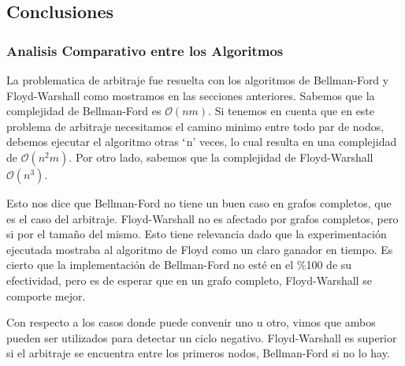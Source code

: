 \subsection{Conclusiones}

\subsubsection{Analisis Comparativo entre los Algoritmos} \label{analisisComparativo}

La problematica de arbitraje fue resuelta con los algoritmos de Bellman-Ford y Floyd-Warshall como mostramos en las secciones anteriores. Sabemos que la complejidad de Bellman-Ford es $\mathcal{O}(nm)$. Si tenemos en cuenta que en este problema de arbitraje necesitamos el camino minimo entre todo par de nodos, debemos ejecutar el algoritmo otras $`$n' veces, lo cual resulta en una complejidad de $\mathcal{O}(n^{2}m)$. Por otro lado, sabemos que la complejidad de Floyd-Warshall $\mathcal{O}(n^{3})$.

Esto nos dice que Bellman-Ford no tiene un buen caso en grafos completos, que es el caso del arbitraje. Floyd-Warshall no es afectado por grafos completos, pero si por el tamaño del mismo. Esto tiene relevancia dado que la experimentación ejecutada mostraba al algoritmo de Floyd como un claro ganador en tiempo. Es cierto que la implementación de Bellman-Ford no esté en el $\%$100 de su efectividad, pero es de esperar que en un grafo completo, Floyd-Warshall se comporte mejor.

Con respecto a los casos donde puede convenir uno u otro, vimos que ambos pueden ser utilizados para detectar un ciclo negativo. Floyd-Warshall es superior si el arbitraje se encuentra entre los primeros nodos, Bellman-Ford si no lo hay.